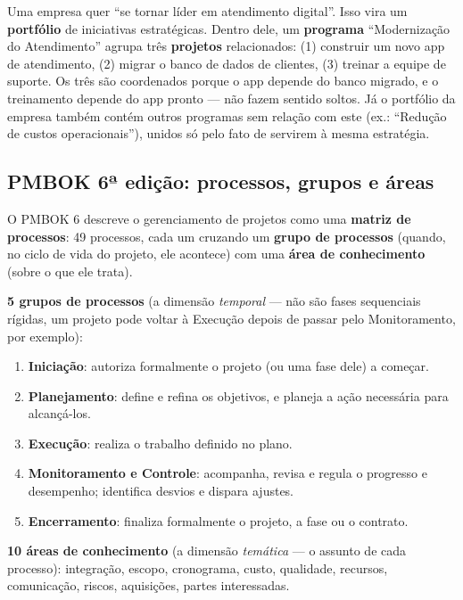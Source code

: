 \begin{exemplo}
Uma empresa quer “se tornar líder em atendimento digital”. Isso vira um
\textbf{portfólio} de iniciativas estratégicas. Dentro dele, um
\textbf{programa} “Modernização do Atendimento” agrupa três
\textbf{projetos} relacionados: (1) construir um novo app de atendimento,
(2) migrar o banco de dados de clientes, (3) treinar a equipe de suporte. Os
três são coordenados porque o app depende do banco migrado, e o treinamento
depende do app pronto --- não fazem sentido soltos. Já o portfólio da
empresa também contém outros programas sem relação com este (ex.: “Redução
de custos operacionais”), unidos só pelo fato de servirem à mesma
estratégia.
\end{exemplo}

\subsection{PMBOK 6ª edição: processos, grupos e áreas}

\begin{conceito}
O PMBOK 6 descreve o gerenciamento de projetos como uma \textbf{matriz de
processos}: 49 processos, cada um cruzando um \textbf{grupo de processos}
(quando, no ciclo de vida do projeto, ele acontece) com uma \textbf{área de
conhecimento} (sobre o que ele trata).

\textbf{5 grupos de processos} (a dimensão \emph{temporal} --- não são
fases sequenciais rígidas, um projeto pode voltar à Execução depois de
passar pelo Monitoramento, por exemplo):
\begin{enumerate}
\item \textbf{Iniciação}: autoriza formalmente o projeto (ou uma fase dele)
a começar.
\item \textbf{Planejamento}: define e refina os objetivos, e planeja a ação
necessária para alcançá-los.
\item \textbf{Execução}: realiza o trabalho definido no plano.
\item \textbf{Monitoramento e Controle}: acompanha, revisa e regula o
progresso e desempenho; identifica desvios e dispara ajustes.
\item \textbf{Encerramento}: finaliza formalmente o projeto, a fase ou o
contrato.
\end{enumerate}

\textbf{10 áreas de conhecimento} (a dimensão \emph{temática} --- o assunto
de cada processo): integração, escopo, cronograma, custo, qualidade,
recursos, comunicação, riscos, aquisições, partes interessadas.
\end{conceito}

